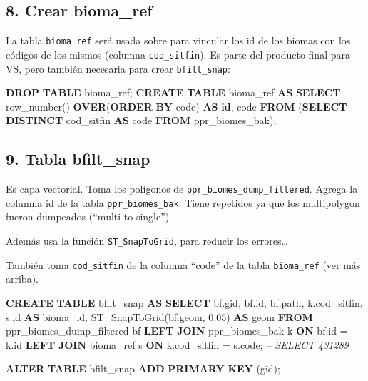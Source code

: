 \documentclass[spanish,]{article}
\newenvironment{Shaded}{}{}
\newcommand{\KeywordTok}[1]{\textcolor[rgb]{0.00,0.44,0.13}{\textbf{{#1}}}}
\newcommand{\FloatTok}[1]{\textcolor[rgb]{0.25,0.63,0.44}{{#1}}}
\newcommand{\CommentTok}[1]{\textcolor[rgb]{0.38,0.63,0.69}{\textit{{#1}}}}
\newcommand{\FunctionTok}[1]{\textcolor[rgb]{0.02,0.16,0.49}{{#1}}}
\newcommand{\NormalTok}[1]{{#1}}
\begin{document}
\subsection{8. Crear bioma\_ref}\label{crear-biomaux5fref}

La tabla \texttt{bioma\_ref} será usada sobre para vincular los id de
los biomas con los códigos de los mismos (columna \texttt{cod\_sitfin}).
Es parte del producto final para VS, pero también necesaria para crear
\texttt{bfilt\_snap}:

\begin{Shaded}
\begin{Highlighting}[]
\KeywordTok{DROP} \KeywordTok{TABLE} \NormalTok{bioma_ref;}
\KeywordTok{CREATE} \KeywordTok{TABLE} \NormalTok{bioma_ref }\KeywordTok{AS} 
\KeywordTok{SELECT} \FunctionTok{row_number}\NormalTok{() }\KeywordTok{OVER}\NormalTok{(}\KeywordTok{ORDER} \KeywordTok{BY} \NormalTok{code) }\KeywordTok{AS} \KeywordTok{id}\NormalTok{, code }
  \KeywordTok{FROM} \NormalTok{(}\KeywordTok{SELECT} \KeywordTok{DISTINCT} \NormalTok{cod_sitfin }\KeywordTok{AS} \NormalTok{code }\KeywordTok{FROM} \NormalTok{ppr_biomes_bak);}
\end{Highlighting}
\end{Shaded}

\subsection{9. Tabla bfilt\_snap}\label{tabla-bfiltux5fsnap}

Es capa vectorial. Toma los polígonos de
\texttt{ppr\_biomes\_dump\_filtered}. Agrega la columna id de la tabla
\texttt{ppr\_biomes\_bak}. Tiene repetidos ya que los multipolygon
fueron dumpeados (``multi to single'')

Además usa la función \texttt{ST\_SnapToGrid}, para reducir los
errores\ldots{}

También toma \texttt{cod\_sitfin} de la columna ``code'' de la tabla
\texttt{bioma\_ref} (ver más arriba).

\begin{Shaded}
\begin{Highlighting}[]
\KeywordTok{CREATE} \KeywordTok{TABLE} \NormalTok{bfilt_snap }\KeywordTok{AS}
\KeywordTok{SELECT} \NormalTok{bf.gid, bf.id, bf.path, }
       \NormalTok{k.cod_sitfin, s.id }\KeywordTok{AS} \NormalTok{bioma_id, }
       \NormalTok{ST_SnapToGrid(bf.geom, }\FloatTok{0.05}\NormalTok{) }\KeywordTok{AS} \NormalTok{geom}
  \KeywordTok{FROM} \NormalTok{ppr_biomes_dump_filtered bf}
  \KeywordTok{LEFT} \KeywordTok{JOIN} \NormalTok{ppr_biomes_bak k }\KeywordTok{ON} \NormalTok{bf.id = k.id}
  \KeywordTok{LEFT} \KeywordTok{JOIN} \NormalTok{bioma_ref s      }\KeywordTok{ON} \NormalTok{k.cod_sitfin = s.code;}
\CommentTok{-- SELECT 431289}

\KeywordTok{ALTER} \KeywordTok{TABLE} \NormalTok{bfilt_snap }\KeywordTok{ADD} \KeywordTok{PRIMARY} \KeywordTok{KEY} \NormalTok{(gid);}
\end{Highlighting}
\end{Shaded}
\end{document}
